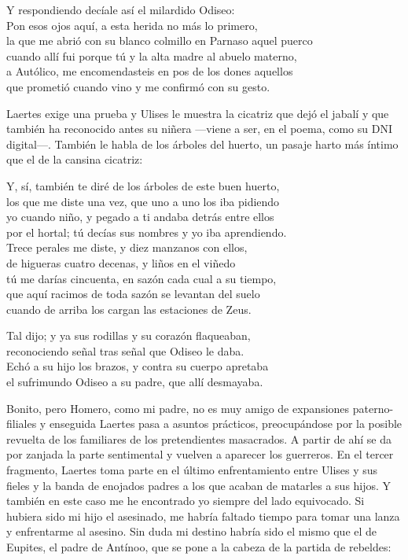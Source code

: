 \begin{versocita}
Y respondiendo decíale así el milardido Odiseo:\\
Pon esos ojos aquí, a esta herida no más lo primero,\\
la que me abrió con su blanco colmillo en Parnaso aquel puerco\\
cuando allí fui porque tú y la alta madre al abuelo materno,\\
a Autólico, me encomendasteis en pos de los dones aquellos\\
que prometió cuando vino y me confirmó con su gesto.
\end{versocita}

Laertes exige una prueba y Ulises le muestra la cicatriz que dejó el jabalí y que también ha reconocido antes su niñera ---viene a ser, en el poema, como su DNI digital---. También le habla de los árboles del huerto, un pasaje harto más íntimo que el de la cansina cicatriz:

\begin{versocita}
Y, sí, también te diré de los árboles de este buen huerto,\\
los que me diste una vez, que uno a uno los iba pidiendo\\
yo cuando niño, y pegado a ti andaba detrás entre ellos\\
por el hortal; tú decías sus nombres y yo iba aprendiendo.\\
Trece perales me diste, y diez manzanos con ellos,\\
de higueras cuatro decenas, y liños en el viñedo\\
tú me darías cincuenta, en sazón cada cual a su tiempo,\\
que aquí racimos de toda sazón se levantan del suelo\\
cuando de arriba los cargan las estaciones de Zeus.
\end{versocita}

\begin{versocita}
Tal dijo; y ya sus rodillas y su corazón flaqueaban,\\
reconociendo señal tras señal que Odiseo le daba.\\
Echó a su hijo los brazos, y contra su cuerpo apretaba\\
el sufrimundo Odiseo a su padre, que allí desmayaba.
\end{versocita}

Bonito, pero Homero, como mi padre, no es muy amigo de expansiones paterno-filiales y enseguida Laertes pasa a asuntos prácticos, preocupándose por la posible revuelta de los familiares de los pretendientes masacrados. A partir de ahí se da por zanjada la parte sentimental y vuelven a aparecer los guerreros. En el tercer fragmento, Laertes toma parte en el último enfrentamiento entre Ulises y sus fieles y la banda de enojados padres a los que acaban de matarles a sus hijos. Y también en este caso me he encontrado yo siempre del lado equivocado. Si hubiera sido mi hijo el asesinado, me habría faltado tiempo para tomar una lanza y enfrentarme al asesino. Sin duda mi destino habría sido el mismo que el de Eupites, el padre de Antínoo, que se pone a la cabeza de la partida de rebeldes:

